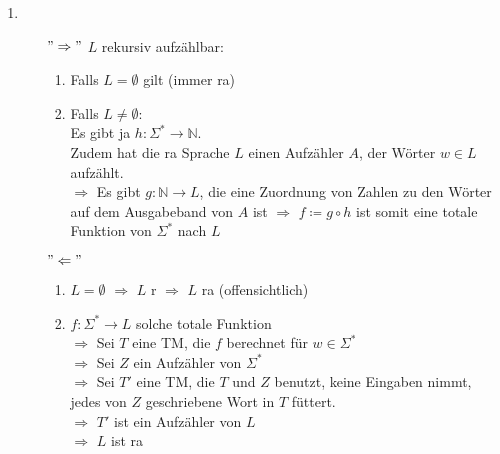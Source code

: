 \documentclass[a4paper,11pt]{scrartcl}
\begin{document}
\begin{enumerate}[label=\alph*)]
	\item	\begin{itemize}
			\item[$"\Rightarrow"$]
				$L$ rekursiv aufzählbar:
				\begin{enumerate}[label=\arabic*)]
				\item	Falls  $L = \emptyset$ gilt (immer ra)
				\item	Falls $L \neq \emptyset$:\\
						Es gibt ja $h: \Sigma^* \rightarrow \mathbb{N}$.\\
						Zudem hat die ra Sprache $L$ einen Aufzähler $A$, der Wörter $w \in L$ aufzählt.\\
						$\Rightarrow$ Es gibt $g: \mathbb{N} \rightarrow L$, die eine Zuordnung von Zahlen zu den Wörter auf dem Ausgabeband von $A$ ist
						$\Rightarrow$ $f \coloneqq g \circ h$ ist somit eine totale Funktion von $\Sigma^*$ nach $L$
				\end{enumerate}
			
			\item[$"\Leftarrow"$]
				\begin{enumerate}[label=\arabic*)]
				\item	$L=\emptyset$ $\Rightarrow$ $L$ r $\Rightarrow$ $L$ ra (offensichtlich)
				\item	$f: \Sigma^* \rightarrow L$ solche totale Funktion\\
						$\Rightarrow$ Sei $T$ eine TM, die $f$ berechnet für $w \in \Sigma^*$\\
						$\Rightarrow$ Sei $Z$ ein Aufzähler von $\Sigma^*$\\
						$\Rightarrow$ Sei $T'$ eine TM, die $T$ und $Z$ benutzt, keine Eingaben nimmt, jedes von $Z$ geschriebene Wort in $T$ füttert.\\
						$\Rightarrow$ $T'$ ist ein Aufzähler von $L$\\
						$\Rightarrow$ $L$ ist ra
				\end{enumerate}
			
			\end{itemize}
	\end{enumerate}
	
	
\end{document}
